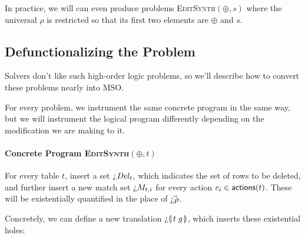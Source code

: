 In practice, we will can even produce problems \textsc{EditSynth}$(\oplus,s)$
where the universal $\rho$ is restricted so that its first two elements are
$\oplus$ and $s$.



\subsection{Defunctionalizing the Problem}

Solvers don't like such high-order logic problems, so we'll describe how to
convert these problems nearly into MSO.

For every problem, we instrument the same concrete program in the same way, but
we will instrument the logical program differently depending on the modification
we are making to it.

\paragraph{Concrete Program \textsc{EditSynth}$(\oplus, t)$}

For every table $t$, insert a set $\hole{\mathit{Del}_t}$, which indicates the
set of rows to be deleted, and further insert a new match set $\hole{M_{t,i}}$
for every action $c_i \in \mathsf{actions}(t)$. These will be existentially quantified in
the place of $\vec{\hole{\rho}}$.

Concretely, we can define a new translation $\hole{}\parenbb{t\; g}$,
which inserts these existential holes:

